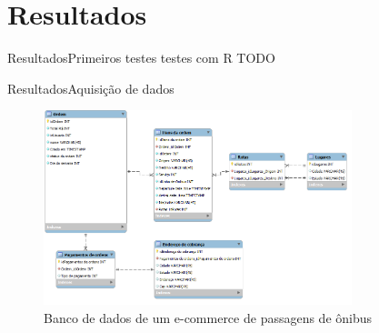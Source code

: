 \section[Resultados]{Resultados}

\begin{frame}{Resultados}{Primeiros testes}
testes com R TODO
\end{frame}

\begin{frame}{Resultados}{Aquisição de dados}
\begin{center}
\begin{figure}[ht]
    \includegraphics[width=0.8\textwidth]{../img/estrutura-banco-de-dados}
    \caption{Banco de dados de um e-commerce de passagens de ônibus}
    \label{fig:bd-clickbus}
\end{figure}
\end{center}
\end{frame}